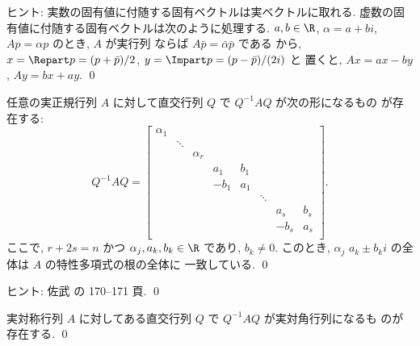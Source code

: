 \documentclass[12pt,twoside]{jarticle}
\begin{document}
\noindent
ヒント: 実数の固有値に付随する固有ベクトルは実ベクトルに取れる.
虚数の固有値に付随する固有ベクトルは次のように処理する. 
$a,b\in\R$, $\alpha=a+bi$, $Ap=\alpha p$ のとき, $A$ が実行列
ならば $A\bar{p}=\bar{\alpha}\bar{p}$ である
から, $x = \Repart p = (p+\bar{p})/2$, %
$y = \Impart p = (p-\bar{p})/(2i)$ と
置くと, $Ax = ax - by$, $Ay = bx + ay$.
\qed


\begin{question}
\label{q:real-Toeplitz}
  任意の実正規行列 $A$ に対して直交行列 $Q$ で $Q^{-1}AQ$ が次の形になるもの
  が存在する:
  \begin{equation*}
    Q^{-1}AQ =
    \begin{bmatrix}
      \alpha_1 &        &          &       &     &        &       &     \\
               & \ddots &          &       &     &        &       &     \\
               &        & \alpha_r &       &     &        &       &     \\
               &        &          &   a_1 & b_1 &        &       &     \\
               &        &          & - b_1 & a_1 &        &       &     \\
               &        &          &       &     & \ddots &       &     \\
               &        &          &       &     &        &   a_s & b_s \\
               &        &          &       &     &        & - b_s & a_s \\
    \end{bmatrix}.
  \end{equation*}
  ここで, $r+2s=n$ かつ $\alpha_j,a_k,b_k\in\R$ であり, $b_k\ne 0$. 
  このとき, $\alpha_j$ $a_k \pm b_k i$ の全体は $A$ の特性多項式の根の全体に
  一致している.  \qed
\end{question}

\noindent
ヒント: 佐武 \cite{satake} の 170--171 頁.
\qed


\begin{question}[実対称行列の対角化]
\label{q:real-symmetric}
  実対称行列 $A$ に対してある直交行列 $Q$ で $Q^{-1}AQ$ が実対角行列になるも
  のが存在する. \qed
\end{question}
\end{document}
